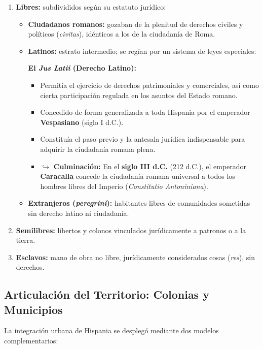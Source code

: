 \documentclass[11pt,letterpaper]{article}
\begin{document}
\begin{enumerate}
  \item \textbf{Libres:} subdivididos según su estatuto jurídico:
  \begin{itemize}
    \item \textbf{Ciudadanos romanos:} gozaban de la plenitud de derechos civiles y políticos (\textit{civitas}), idénticos a los de la ciudadanía de Roma.
    \item \textbf{Latinos:} estrato intermedio; se regían por un sistema de leyes especiales:
    \begin{subbox}
      \textbf{El \textit{Jus Latii} (Derecho Latino):}
      \begin{itemize}
        \item Permitía el ejercicio de derechos patrimoniales y comerciales, así como cierta participación regulada en los asuntos del Estado romano.
        \item Concedido de forma generalizada a toda Hispania por el emperador \textbf{Vespasiano} (siglo I d.C.).
        \item Constituía el paso previo y la antesala jurídica indispensable para adquirir la ciudadanía romana plena.
        \item $\hookrightarrow$ \textbf{Culminación:} En el \textbf{siglo III d.C.} (212 d.C.), el emperador \textbf{Caracalla} concede la ciudadanía romana universal a todos los hombres libres del Imperio (\textit{Constitutio Antoniniana}).
      \end{itemize}
    \end{subbox}
    \item \textbf{Extranjeros (\textit{peregrini}):} habitantes libres de comunidades sometidas sin derecho latino ni ciudadanía.
  \end{itemize}
  \item \textbf{Semilibres:} libertos y colonos vinculados jurídicamente a patronos o a la tierra.
  \item \textbf{Esclavos:} mano de obra no libre, jurídicamente considerados cosas (\textit{res}), sin derechos.
\end{enumerate}

\subsection{Articulación del Territorio: Colonias y Municipios}
La integración urbana de Hispania se desplegó mediante dos modelos complementarios:
\end{document}
